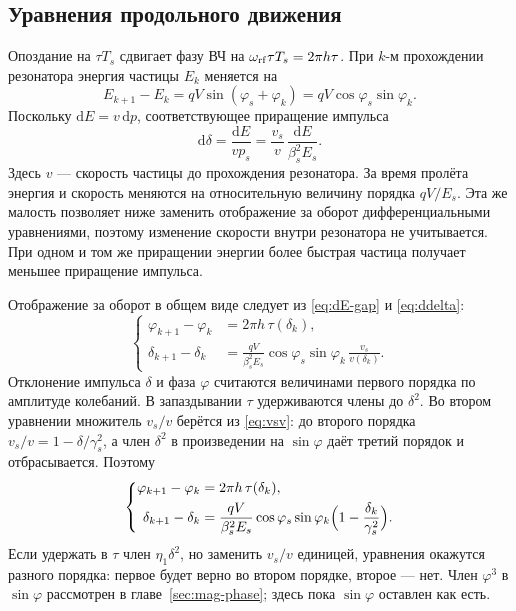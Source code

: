 \subsection{Уравнения продольного движения}

Опоздание на $\tau T_s$ сдвигает фазу ВЧ на $\omega_{\mathrm{rf}}\tau T_s=2\pi h\tau$. При $k$-м прохождении резонатора энергия частицы $E_k$ меняется на
\begin{equation}
\label{eq:dE-gap}
E_{k+1}-E_k=qV\sin(\varphi_s+\varphi_k)=qV\cos\varphi_s\sin\varphi_k.
\end{equation}
Поскольку $\mathrm{d}E=v\,\mathrm{d}p$, соответствующее приращение импульса
\begin{equation}
\label{eq:ddelta}
\mathrm{d}\delta=\frac{\mathrm{d}E}{vp_s}=\frac{v_s}{v}\,\frac{\mathrm{d}E}{\beta_s^2E_s}.
\end{equation}
Здесь $v$ --- скорость частицы до прохождения резонатора. За время пролёта энергия и скорость меняются на относительную величину порядка $qV/E_s$. Эта же малость позволяет ниже заменить отображение за оборот дифференциальными уравнениями, поэтому изменение скорости внутри резонатора не учитывается. При одном и том же приращении энергии более быстрая частица получает меньшее приращение импульса.

Отображение за оборот в общем виде следует из \eqref{eq:dE-gap} и \eqref{eq:ddelta}:
\begin{equation}
\label{eq:map-gen}
\left\{
\begin{aligned}
\varphi_{k+1}-\varphi_k&=2\pi h\,\tau(\delta_k),\\
\delta_{k+1}-\delta_k
&=\frac{qV}{\beta_s^2E_s}\cos\varphi_s\sin\varphi_k
\,\frac{v_s}{v(\delta_k)}.
\end{aligned}
\right.
\end{equation}
Отклонение импульса $\delta$ и фаза $\varphi$ считаются величинами первого порядка по амплитуде колебаний. В запаздывании $\tau$ удерживаются члены до $\delta^2$. Во втором уравнении множитель $v_s/v$ берётся из \eqref{eq:vsv}: до второго порядка $v_s/v=1-\delta/\gamma_s^2$, а член $\delta^2$ в произведении на $\sin\varphi$ даёт третий порядок и отбрасывается. Поэтому
\begin{equation}
\label{eq:map}
\left\{
\begin{aligned}
\varphi_{k+1}-\varphi_k&=2\pi h\,\tau(\delta_k),\\
\delta_{k+1}-\delta_k
&=\frac{qV}{\beta_s^2E_s}\cos\varphi_s\sin\varphi_k
\Bigl(1-\frac{\delta_k}{\gamma_s^2}\Bigr).
\end{aligned}
\right.
\end{equation}
Если удержать в $\tau$ член $\eta_1\delta^2$, но заменить $v_s/v$ единицей, уравнения окажутся разного порядка: первое будет верно во втором порядке, второе --- нет. Член $\varphi^3$ в $\sin\varphi$ рассмотрен в главе~\ref{sec:mag-phase}; здесь пока $\sin\varphi$ оставлен как есть.

